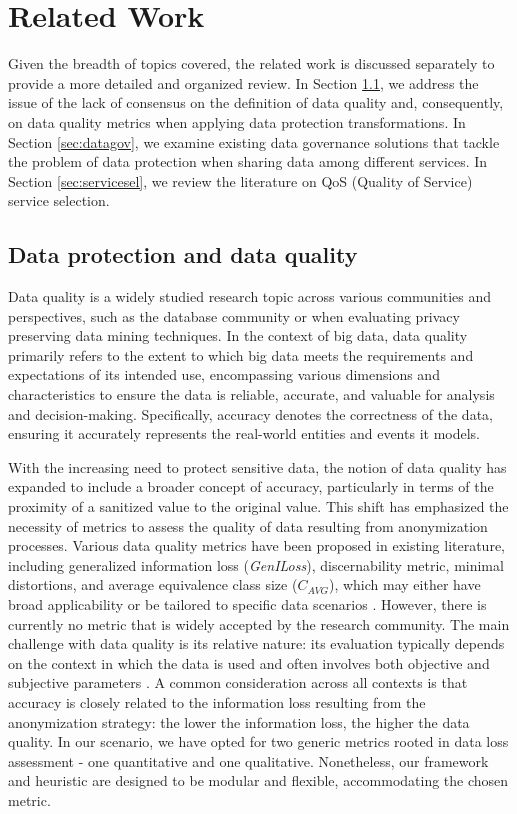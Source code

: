 \section{Related Work}\label{sec:related}

Given the breadth of topics covered, the related work is discussed separately to provide a more detailed and organized review. In Section  \ref{sec:dataquality}, we address the issue of the lack of consensus on the definition of data quality and, consequently, on data quality metrics when applying data protection transformations. In Section \ref{sec:datagov}, we examine existing data governance solutions that tackle the problem of data protection when sharing data among different services. In Section \ref{sec:servicesel}, we review the literature on QoS (Quality of Service) service selection.

\subsection{Data protection and data quality}\label{sec:dataquality}

Data quality is a widely studied research topic across various communities and perspectives, such as the database community or when evaluating privacy preserving data mining techniques. In the context of big data, data quality primarily refers to the extent to which big data meets the requirements and expectations of its intended use, encompassing various dimensions and characteristics to ensure the data is reliable, accurate, and valuable for analysis and decision-making. Specifically, accuracy denotes the correctness of the data, ensuring it accurately represents the real-world entities and events it models.

With the increasing need to protect sensitive data, the notion of data quality has expanded to include a broader concept of accuracy, particularly in terms of the proximity of a sanitized value to the original value. 
This shift has emphasized the necessity of metrics to assess the quality of data resulting from anonymization processes. Various data quality metrics have been proposed in existing literature, including generalized information loss (\textit{GenILoss}), discernability metric, minimal distortions, and average equivalence class size ($C_{AVG}$), which may either have broad applicability or be tailored to specific data scenarios \cite{Majeed2021AnonymizationTF,bookMetrics,reviewMetrics}. However, there is currently no metric that is widely accepted by the research community. The main challenge with data quality is its relative nature: its evaluation typically depends on the context in which the data is used and often involves both objective and subjective parameters \cite{dataAccuracy,dataQuality}.
%
A common consideration across all contexts is that accuracy is closely related to the information loss resulting from the anonymization strategy: the lower the information loss, the higher the data quality. In our scenario, we have opted for two generic metrics rooted in data loss assessment - one quantitative and one qualitative. Nonetheless, our framework and heuristic are designed to be modular and flexible, accommodating the chosen metric.

